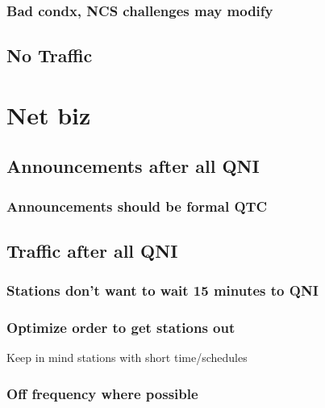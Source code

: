 \documentclass[11pt]{article}
\begin{document}
\subsubsection{Bad condx, NCS challenges may modify}
\label{sec-2.3.2}

\subsection{No Traffic}
\label{sec-2.4}

\section{Net biz}
\label{sec-3}

\subsection{Announcements after all QNI}
\label{sec-3.1}

\subsubsection{Announcements should be formal QTC}
\label{sec-3.1.1}

\subsection{Traffic after all QNI}
\label{sec-3.2}

\subsubsection{Stations don't want to wait 15 minutes to QNI}
\label{sec-3.2.1}

\subsubsection{Optimize order to get stations out}
\label{sec-3.2.2}

\begin{description}

\item[Keep in mind stations with short time/schedules]\label{sec-3.2.2.1}


\end{description}
\subsubsection{Off frequency where possible}
\label{sec-3.2.3}
\end{document}
